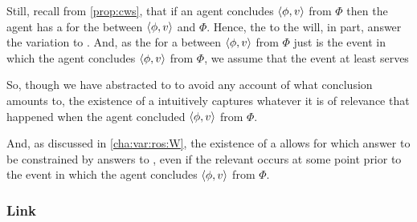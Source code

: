 \begin{note}
  Still, recall from \autoref{prop:cws}, that if an agent concludes \(\langle \phi, v \rangle\) from \(\Phi\) then the agent has a \wit{} for the  between \(\langle \phi, v \rangle\) and \(\Phi\).
  Hence, the  to the  will, in part, answer the variation to \qHow{}.
  And, as the  for a  between \(\langle \phi, v \rangle\) from \(\Phi\) just is the event in which the agent concludes \(\langle \phi, v \rangle\) from \(\Phi\), we assume that the event at least serves 


  So, though we have abstracted to  to avoid any account of what conclusion amounts to, the existence of a  intuitively captures whatever it is of relevance that happened when the agent concluded \(\langle \phi, v \rangle\) from \(\Phi\).

  And, as discussed in \autoref{cha:var:ros:W}, the existence of a  allows for \ros{} which answer \qWhyVnP{} to be constrained by answers to \qHowV{}, even if the relevant  occurs at some point prior to the event in which the agent concludes \(\langle \phi, v \rangle\) from \(\Phi\).
\end{note}

\subsubsection{Link}
\label{cha:var:sec:vars:qhowv:sec:link}


